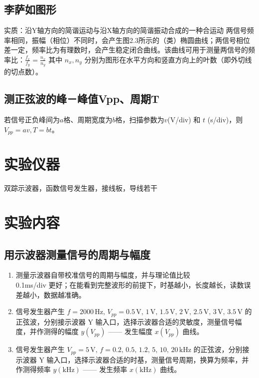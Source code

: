 \documentclass[12pt,a4paper]{article}
\begin{document}
		\subsection{李萨如图形}
		实质：沿Y轴方向的简谐运动与沿X轴方向的简谐振动合成的一种合运动
		两信号频率相同，振幅（相位）不同时，会产生图2.3所示的（类）椭圆曲线；两信号相位差一定，频率比为有理数时，会产生稳定闭合曲线。该曲线可用于测量两信号的频率比：$\frac{f_x}{f_y} = \frac{n_x}{n_y}$
		其中 $n_x, n_y$ 分别为图形在水平方向和竖直方向上的叶数（即外切线的切点数）。

		\subsection{测正弦波的峰－峰值Vpp、周期T}
		若信号正负峰间为$a$格、周期宽度为$b$格，扫描参数为$v$(V/div) 和 $t$ (s/div)，则 $V_{pp} = av, T = bt$。


	
	\section{实验仪器}
		双踪示波器，函数信号发生器，接线板，导线若干

	\section{实验内容}
	\setcounter{section}{5}
	\setcounter{subsection}{0}
	\subsection{用示波器测量信号的周期与幅度}
	\begin{enumerate}
    \item 测量示波器自带校准信号的周期与幅度，并与理论值比较 \\
	0.1ms/div 更好；在能看到完整波形的前提下，时基越小，长度越长，读数误差越小，数据越准确。
    \item 信号发生器产生 $f=2000\,\mathrm{Hz},\, V_{pp}=0.5\,\mathrm{V},\, 1\,\mathrm{V},\, 1.5\,\mathrm{V},\, 2\,\mathrm{V},\, 2.5\,\mathrm{V},\, 3\,\mathrm{V},\, 3.5\,\mathrm{V}$ 的正弦波，分别接示波器 Y 输入口，选择示波器合适的灵敏度，测量信号幅度，并作测得的幅度 $y(V_{pp})$ —— 发生幅度 $x(V_{pp})$ 曲线。
    \item 信号发生器产生 $V_{pp}=5\,\mathrm{V},\, f=0.2,\, 0.5,\, 1.2,\, 5,\, 10,\, 20\,\mathrm{kHz}$ 的正弦波，分别接示波器 Y 输入口，选择示波器合适的时基，测量信号周期，换算为频率，并作测得频率 $y(\mathrm{kHz})$ —— 发生频率 $x(\mathrm{kHz})$ 曲线。
	\end{enumerate}
\end{document}
